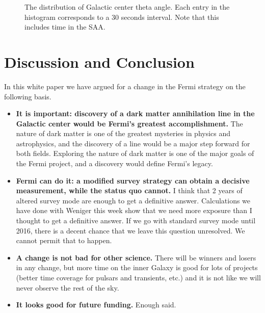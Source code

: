 \documentclass[aps,prd,superscriptaddress,showpacs,nofootinbib,fixlfloat, 12pt]{revtex4-1}
\begin{document}
\begin{figure}[t]
\begin{center}
    \vspace{-0.5cm}
  \end{center}
  \caption{The distribution of Galactic center theta angle. Each entry in the histogram corresponds to a 30 seconds interval. Note that this includes time in the SAA.} %
  \label{fig:coverage}
\end{figure}

\section{Discussion and Conclusion}
\label{sec:Conclusion}

In this white paper we have argued for a change in the Fermi strategy on the
following basis.

\begin{itemize}

\item{\bf It is important: discovery of a dark matter annihilation line in the
    Galactic center would be Fermi's greatest accomplishment.}  The nature of
  dark matter is one of the greatest mysteries in physics and astrophysics,
  and the discovery of a line would be a major step forward for both fields.
  Exploring the nature of dark matter is one of the major goals of the Fermi
  project, and a discovery would define Fermi's legacy.

\item{\bf Fermi can do it: a modified survey strategy can obtain a decisive
    measurement, while the status quo cannot.}  I think that 2 years of
  altered survey mode are enough to get a definitive answer.  Calculations we
  have done with Weniger this week show that we need more exposure than I
  thought to get a definitive answer.  If we go with standard survey mode
  until 2016, there is a decent chance that we leave this question unresolved.
  We cannot permit that to happen.

\item{\bf A change is not bad for other science.}  There will be winners and
  losers in any change, but more time on the inner Galaxy is good for lots of
  projects (better time coverage for pulsars and transients, etc.) and it is
  not like we will never observe the rest of the sky.

\item{\bf It looks good for future funding.}  Enough said. 

\end{itemize}
\end{document}
